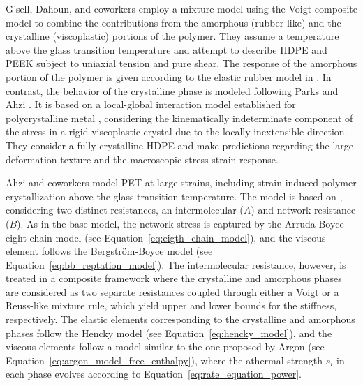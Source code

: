G'sell, Dahoun, and coworkers \citep{gsellEvolutionMicrostructureSemicrystalline1994, dahounPlasticBehaviorDeformation1995} employ a mixture model using the Voigt composite model to combine the contributions from the amorphous (rubber-like) and the crystalline (viscoplastic) portions of the polymer.
They assume a temperature above the glass transition temperature and attempt to describe HDPE and PEEK subject to uniaxial tension and pure shear.
The response of the amorphous portion of the polymer is given according to the elastic rubber model in \cite{wuImprovedNetworkModels1993}.
 In contrast, the behavior of the crystalline phase is modeled following Parks and Ahzi \citep{parksPolycrystallinePlasticDeformation1990}.
It is based on a local-global interaction model established for polycrystalline metal \citep{molinariSelfConsistentApproach1987}, considering the kinematically indeterminate component of the stress in a rigid-viscoplastic crystal due to the locally inextensible direction.
They consider a fully crystalline HDPE and make predictions regarding the large deformation texture and the macroscopic stress-strain response.


Ahzi and coworkers \citep{ahziModelingDeformationBehavior2003} model PET at large strains, including strain-induced polymer crystallization above the glass transition temperature.
The model is based on \cite{boyceConstitutiveModelFinite2000}, considering two distinct resistances, an intermolecular ($A$) and network resistance ($B$).
As in the base model, the network stress is captured by the Arruda-Boyce eight-chain model (see Equation~\eqref{eq:eigth_chain_model}), and the viscous element follows the Bergström-Boyce model (see Equation~\eqref{eq:bb_reptation_model}).
The intermolecular resistance, however, is treated in a composite framework where the crystalline and amorphous phases are considered as two separate resistances coupled through either a Voigt or a Reuss-like mixture rule, which yield upper and lower bounds for the stiffness, respectively.
The elastic elements corresponding to the crystalline and amorphous phases follow the Hencky model (see Equation~\eqref{eq:hencky_model}), and the viscous elements follow a model similar to the one proposed by Argon (see Equation~\eqref{eq:argon_model_free_enthalpy}), where the athermal strength $s_i$ in each phase evolves according to Equation~\eqref{eq:rate_equation_power}.

